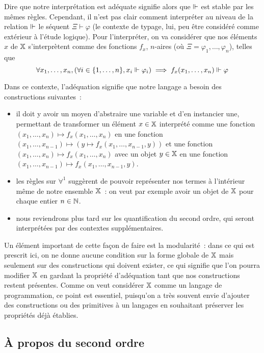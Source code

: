 \documentclass{article}
\begin{document}
Dire que notre interprétation est adéquate signifie alors que $\Vdash$  est stable par les mêmes règles. Cependant, il n'est pas clair comment interpréter au niveau de la relation $\Vdash$ le séquent $\Xi\vdash \varphi$ (le contexte de typage, lui, peu être considéré comme extérieur à l'étude logique). Pour l'interpréter, on va considérer que nos éléments $x$ de $\mathbb X$ s'interprètent comme des fonctions $f_x$, $n$-aires (où $\Xi = \varphi_1,\ldots,\varphi_n$), telles que
\[\forall x_1,\ldots,x_n, (\forall i \in \{1,\ldots,n\}, x_i \Vdash \varphi_i)\implies f_x(x_1,\ldots,x_n)\Vdash\varphi\]

Dans ce contexte, l'adéquation signifie que notre langage a besoin des constructions suivantes~:
\begin{itemize}
    \item {} il doit y avoir un moyen d'abstraire une variable et d'en instancier une, permettant de transformer un élément $x\in\mathbb X$ interprété comme une fonction $(x_1,\ldots,x_n) \mapsto f_x(x_1,\ldots,x_n)$ en une fonction $(x_1,\ldots,x_{n-1})\mapsto (y\mapsto f_x(x_1,\ldots,x_{n-1},y))$ et une fonction $(x_1,\ldots,x_n)\mapsto f_x(x_1,\ldots,x_n)$ avec un objet $y\in\mathbb X$ en une fonction $(x_1,\ldots,x_{n-1})\mapsto f_x(x_1,\ldots,x_{n-1},y)$.
    \item les règles sur $\forall^1$ suggèrent de pouvoir représenter nos termes à l'intérieur même de notre ensemble $\mathbb X$~: on veut par exemple avoir un objet de $\mathbb X$ pour chaque entier $n\in\mathbb{N}$.
    \item nous reviendrons plus tard sur les quantification du second ordre, qui seront interprétées par des contextes supplémentaires.
\end{itemize}

Un élément important de cette façon de faire est la modularité~: dans ce qui est prescrit ici, on ne donne aucune condition sur la forme globale de $\mathbb X$ mais seulement sur des constructions qui doivent exister, ce qui signifie que l'on pourra modifier $\mathbb X$ en gardant la propriété d'adéquation tant que nos constructions restent présentes. Comme on veut considérer $\mathbb X$ comme un langage de programmation, ce point est essentiel, puisqu'on a très souvent envie d'ajouter des constructions ou des primitives à un langages en souhaitant préserver les propriétés déjà établies.

\subsection{À propos du second ordre}
\end{document}
